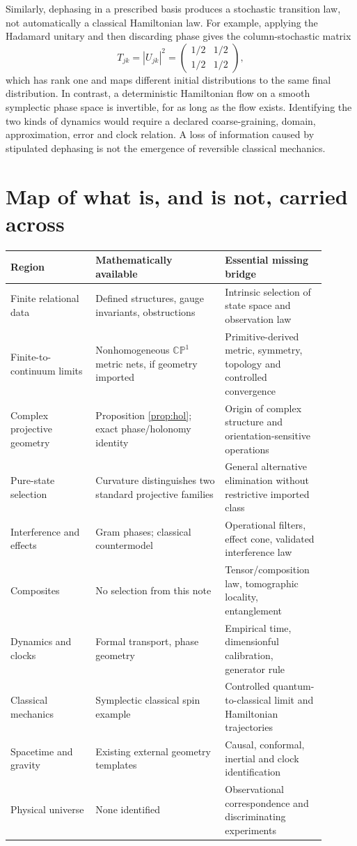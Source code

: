 \documentclass[11pt,a4paper]{article}
\newcommand{\CP}{\mathbb{CP}}
\begin{document}
Similarly, dephasing in a prescribed basis produces a stochastic transition law, not automatically a classical Hamiltonian law. For example, applying the Hadamard unitary and then discarding phase gives the column-stochastic matrix
\[
 T_{jk}=|U_{jk}|^2=\begin{pmatrix}1/2&1/2\\1/2&1/2\end{pmatrix},
\]
which has rank one and maps different initial distributions to the same final distribution. In contrast, a deterministic Hamiltonian flow on a smooth symplectic phase space is invertible, for as long as the flow exists. Identifying the two kinds of dynamics would require a declared coarse-graining, domain, approximation, error and clock relation. A loss of information caused by stipulated dephasing is not the emergence of reversible classical mechanics.

\section{Map of what is, and is not, carried across}
\small
\begin{tabular}{p{0.25\linewidth}p{0.38\linewidth}p{0.27\linewidth}}
\toprule
\textbf{Region} & \textbf{Mathematically available} & \textbf{Essential missing bridge}\\\midrule
Finite relational data & Defined structures, gauge invariants, obstructions & Intrinsic selection of state space and observation law\\
Finite-to-continuum limits & Nonhomogeneous \(\CP^1\) metric nets, if geometry imported & Primitive-derived metric, symmetry, topology and controlled convergence\\
Complex projective geometry & Proposition \ref{prop:hol}; exact phase/holonomy identity & Origin of complex structure and orientation-sensitive operations\\
Pure-state selection & Curvature distinguishes two standard projective families & General alternative elimination without restrictive imported class\\
Interference and effects & Gram phases; classical countermodel & Operational filters, effect cone, validated interference law\\
Composites & No selection from this note & Tensor/composition law, tomographic locality, entanglement\\
Dynamics and clocks & Formal transport, phase geometry & Empirical time, dimensionful calibration, generator rule\\
Classical mechanics & Symplectic classical spin example & Controlled quantum-to-classical limit and Hamiltonian trajectories\\
Spacetime and gravity & Existing external geometry templates & Causal, conformal, inertial and clock identification\\
Physical universe & None identified & Observational correspondence and discriminating experiments\\
\bottomrule
\end{tabular}
\normalsize
\end{document}
